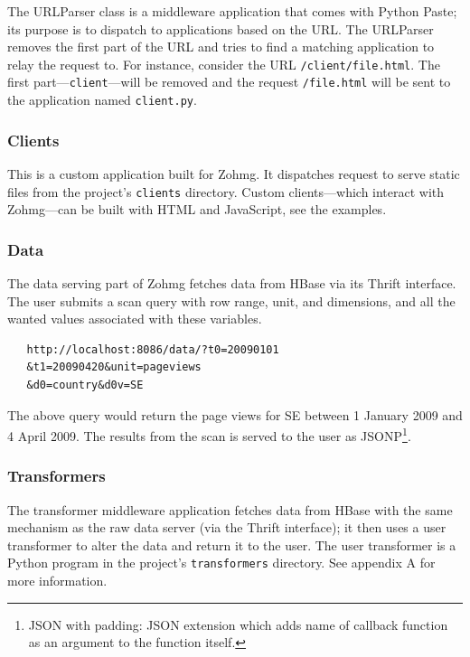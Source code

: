 The URLParser class is a middleware application that comes with Python Paste;
its purpose is to dispatch to applications based on the URL. The URLParser
removes the first part of the URL and tries to find a matching application to
relay the request to. For instance, consider the URL \texttt{/client/file.html}.
The first part---\texttt{client}---will be removed and the request
\texttt{/file.html} will be sent to the application named \texttt{client.py}.


\subsubsection{Clients}

This is a custom application built for Zohmg. It dispatches request to serve
static files from the project's \texttt{clients} directory. Custom
clients---which interact with Zohmg---can be built with HTML and JavaScript, see
the examples.


\subsubsection{Data}

The data serving part of Zohmg fetches data from HBase via its Thrift interface.
The user submits a scan query with row range, unit, and dimensions, and all the
wanted values associated with these variables.

\begin{verbatim}
   http://localhost:8086/data/?t0=20090101
   &t1=20090420&unit=pageviews
   &d0=country&d0v=SE
\end{verbatim}

The above query would return the page views for SE between 1 January
2009 and 4 April 2009. The results from the scan is served to the user as
JSONP\footnote{JSON with padding: JSON extension which adds name of callback
function as an argument to the function itself.}.


\subsubsection{Transformers}

The transformer middleware application fetches data from HBase with the same
mechanism as the raw data server (via the Thrift interface); it then uses a user
transformer to alter the data and return it to the user. The user transformer is
a Python program in the project's \texttt{transformers} directory. See appendix
A for more information.

